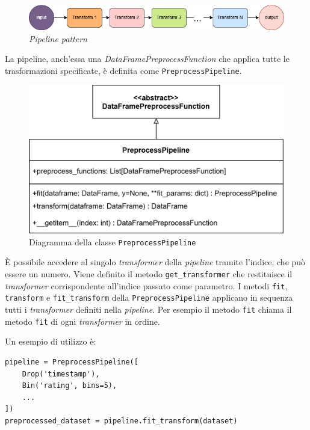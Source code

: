 \begin{figure}[H]
    \centering
    \includegraphics[scale=0.45]{figures/pipeline.png}
    \caption{\textit{Pipeline pattern}}
    \label{fig:pipeline}
\end{figure}

La pipeline, anch'essa una \textit{DataFramePreprocessFunction} che applica tutte le trasformazioni specificate, è definita come \texttt{PreprocessPipeline}.

\begin{figure}[htbp]
    \centering
    \includegraphics[scale=0.2]{figures/UML/preprocessing/preprocess_pipeline.png}
    \caption{Diagramma della classe \texttt{PreprocessPipeline}}
    \label{fig:preprocess_pipeline}
\end{figure}

È possibile accedere al singolo \textit{transformer} della \textit{pipeline} tramite l'indice, che può essere un numero. Viene definito il metodo \texttt{get\_transformer} che restituisce il \textit{transformer} corrispondente all'indice passato come parametro. I metodi \texttt{fit}, \texttt{transform} e \texttt{fit\_transform} della \texttt{PreprocessPipeline} applicano in sequenza tutti i \textit{transformer} definiti nella \textit{pipeline}. Per esempio il metodo \texttt{fit} chiama il metodo \texttt{fit} di ogni \textit{transformer} in ordine.

Un esempio di utilizzo è:

\begin{lstlisting}[caption=esempio di utilizzo di \texttt{PreprocessPipeline}]
pipeline = PreprocessPipeline([
    Drop('timestamp'),
    Bin('rating', bins=5),
    ...
])
preprocessed_dataset = pipeline.fit_transform(dataset) 
\end{lstlisting}

